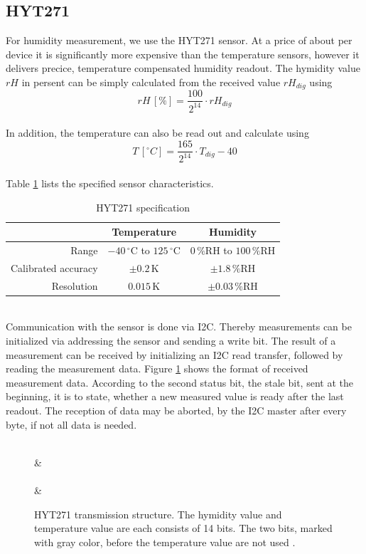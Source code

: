 \documentclass[a4paper]{scrreprt}
\begin{document}
\subsection{HYT271}
For humidity measurement, we use the HYT271 sensor. At a price of about  per device it is significantly more expensive than the temperature sensors, however it delivers precice, temperature compensated humidity readout. 
The hymidity value $rH$ in persent can be simply calculated from the received value $rH_{dig}$ using
$$rH\,[\%] = \frac{100}{2^{14}} \cdot  rH_{dig}$$\\
In addition, the temperature can also be read out and calculate using 
$$T\,[^{\circ} C] = \frac{165}{2^{14}} \cdot  T_{dig} - 40$$\\
Table \ref{tab:hyt} lists the specified sensor characteristics.
\begin{table}[Hh!]
	\centering
	\begin{tabular}{| r | c | c |}
		\hline
    &Temperature & Humidity\\
		\hline
		\hline
    Range & $-40\,^{\circ}\mathrm{C}$ to $125\,^{\circ}\mathrm{C}$ & $0\, \mathrm {\%RH}$ to $100\, \mathrm {\%RH}$\\
		\hline
    Calibrated accuracy & $\pm 0.2\,\mathrm{K}$ & $\pm 1.8\, \mathrm {\%RH}$   \\
		\hline
    Resolution & $0.015\,\mathrm{K}$ & $\pm 0.03\, \mathrm {\%RH}$ \\
		\hline
	\end{tabular}
  \caption{HYT271 specification \cite{hyt}}
	\label{tab:hyt}
\end{table}\\
Communication with the sensor is done via I2C. Thereby measurements can be initialized via addressing the sensor and sending a write bit. The result of a measurement can be received by initializing an I2C read transfer, followed by reading the measurement data. Figure \ref{fig:hyt_transmission} shows the format of received measurement data. According to the second status bit, the stale bit, sent at the beginning, it is to state, whether a new measured value is ready after the last readout. The reception of data may be aborted, by the I2C master after every byte, if not all data is needed.
\begin{figure}[Hh!]
	\centering
	\begin{bytefield}[endianness=big, bitwidth=2.1em]{8}
		\\
     & \\
    \\
     & \\
	\end{bytefield}
  \caption{HYT271 transmission structure. The hymidity value and temperature value are each consists of 14 bits. The two bits, marked with gray color, before the temperature value are not used \cite{hyt2}.}
	\label{fig:hyt_transmission}
\end{figure}\\
\end{document}
